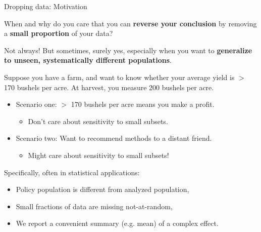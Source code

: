 \begin{frame}{Dropping data: Motivation}

When and why do you care that you can \textbf{reverse your conclusion} by
removing a \textbf{small proportion} of your data?

\pause
\vspace{1em}
Not always!  But sometimes, surely yes, especially when you want to
\textbf{generalize to unseen, systematically different populations}.

\vspace{1em}
Suppose you have a farm, and want to know whether
your average yield is $>$ 170 bushels per acre.
At harvest, you measure 200 bushels per acre.

\pause
\begin{itemize}
    \item Scenario one: $>$ 170 bushels
        per acre means you make a profit.
        \begin{itemize}
            \item Don’t care about sensitivity to small subsets.
        \end{itemize}
    \pause
    \item Scenario two: Want to recommend methods to a distant friend.
    \begin{itemize}
        \item Might care about sensitivity to small subsets!
    \end{itemize}
\end{itemize}

\pause

\vspace{1em}
Specifically, often in statistical applications:
%
\begin{itemize}
\item Policy population is different from analyzed population,
\item Small fractions of data are missing not-at-random,
\item We report a convenient summary (e.g. mean) of a complex effect.
\end{itemize}


\end{frame}
